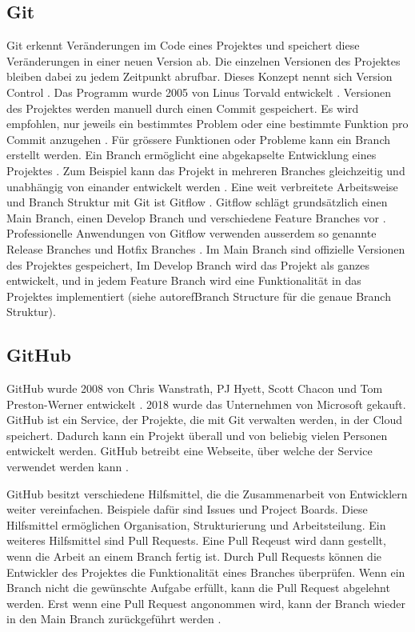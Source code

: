 \subsection{Git}\label{sub:t_git_git} Git erkennt Veränderungen im Code eines
Projektes und speichert diese Veränderungen in einer neuen Version ab. Die
einzelnen Versionen des Projektes bleiben dabei zu jedem Zeitpunkt abrufbar.
Dieses Konzept nennt sich Version Control
\cite{atlassian_git-flow-workflow_nodate}. Das Programm wurde 2005 von Linus
Torvald entwickelt \cite{noauthor_git_2021}. Versionen des Projektes werden
manuell durch einen Commit gespeichert. Es wird empfohlen, nur jeweils ein
bestimmtes Problem oder eine bestimmte Funktion pro Commit anzugehen
\cite{noauthor_5_nodate}. Für grössere Funktionen oder Probleme kann ein Branch
erstellt werden. Ein Branch ermöglicht eine abgekapselte Entwicklung eines
Projektes \cite{guillermo_brachetta_what_2022}. Zum Beispiel kann das Projekt in
mehreren Branches gleichzeitig und unabhängig von einander entwickelt werden
\cite{guillermo_brachetta_what_2022}. Eine weit verbreitete Arbeitsweise und
Branch Struktur mit Git ist Gitflow \cite{noauthor_what_2022}. Gitflow schlägt
grundsätzlich einen Main Branch, einen Develop Branch und verschiedene Feature
Branches vor \cite{atlassian_git-flow-workflow_nodate}. Professionelle
Anwendungen von Gitflow verwenden ausserdem so genannte Release Branches und
Hotfix Branches \cite{cameron_mckenzie_gitflow_2021}. Im Main Branch sind
offizielle Versionen des Projektes gespeichert, Im Develop Branch wird das
Projekt als ganzes entwickelt, und in jedem Feature Branch wird eine
Funktionalität in das Projektes implementiert (siehe autoref{Branch Structure}
für die genaue Branch Struktur). 




\subsection{GitHub}\label{sub:t_git_gh}
GitHub wurde 2008 von Chris Wanstrath, PJ Hyett, Scott Chacon und Tom
Preston-Werner entwickelt \cite{noauthor_github_2021}. 2018 wurde das
Unternehmen von Microsoft gekauft. GitHub ist ein Service, der Projekte, die mit
Git verwalten werden, in der Cloud speichert. Dadurch kann ein Projekt überall
und von beliebig vielen Personen entwickelt werden. GitHub betreibt eine
Webseite, über welche der Service verwendet werden kann
\cite{noauthor_github_2021}.

GitHub besitzt verschiedene Hilfsmittel, die die Zusammenarbeit von Entwicklern
weiter vereinfachen. Beispiele dafür sind Issues und Project Boards. Diese
Hilfsmittel ermöglichen Organisation, Strukturierung und Arbeitsteilung. Ein
weiteres Hilfsmittel sind Pull Requests. Eine Pull Reqeust wird dann gestellt,
wenn die Arbeit an einem Branch fertig ist. Durch Pull Requests können die
Entwickler des Projektes die Funktionalität eines Branches überprüfen. Wenn ein
Branch nicht die gewünschte Aufgabe erfüllt, kann die Pull Request abgelehnt
werden. Erst wenn eine Pull Request angonommen wird, kann der Branch wieder in
den Main Branch zurückgeführt werden \cite{atlassian_pull_nodate}.


